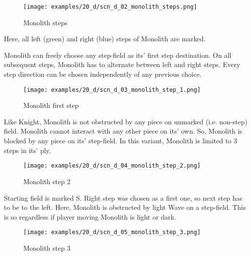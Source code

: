 \vspace*{6.1\baselineskip}
\noindent
\begin{wrapfigure}[9]{l}{0.35\textwidth}
\centering
\texttt{[image: examples/20\_d/scn\_d\_02\_monolith\_steps.png]}
\caption{Monolith steps}
\label{fig:scn_d_02_monolith_steps}
\end{wrapfigure}
Here, all left (green) and right (blue) steps of Monolith are marked.

Monolith can freely choose any step-field as its' first step destination. On all
subsequent steps, Monolith has to alternate between left and right steps. Every
step direction can be chosen independently of any previous choice.

\noindent
\begin{wrapfigure}[9]{l}{0.35\textwidth}
\centering
\texttt{[image: examples/20\_d/scn\_d\_03\_monolith\_step\_1.png]}
\caption{Monolith first step}
\label{fig:scn_d_03_monolith_step_1}
\end{wrapfigure}
Like Knight, Monolith is not obstructed by any piece on unmarked (i.e. non-step)
field. Monolith cannot interact with any other piece on its' own. So, Monolith is
blocked by any piece on its' step-field. In this variant, Monolith is limited
to 3 steps in its' ply.

\clearpage %

\noindent
\begin{figure}[!h]
\texttt{[image: examples/20\_d/scn\_d\_04\_monolith\_step\_2.png]}
\caption{Monolith step 2}
\label{fig:scn_d_04_monolith_step_2}
\end{figure}

Starting field is marked S. Right step was chosen as a first one, so next step
has to be to the left. Here, Monolith is obstructed by light Wave on a step-field.
This is so regardless if player moving Monolith is light or dark.

\clearpage %

\noindent
\begin{figure}[!h]
\texttt{[image: examples/20\_d/scn\_d\_05\_monolith\_step\_3.png]}
\caption{Monolith step 3}
\label{fig:scn_d_05_monolith_step_3}
\end{figure}

